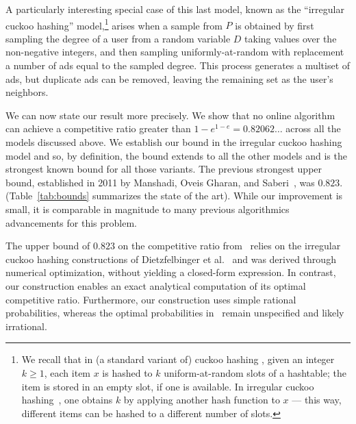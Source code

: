 \documentclass[11pt]{article}
\begin{document}
A particularly interesting special case of this last model, known  as the ``irregular cuckoo hashing'' model,\footnote{We recall that in (a standard variant of) cuckoo hashing \cite{pf04,dw07}, given an integer $k \ge 1$, each item $x$ is hashed to $k$ uniform-at-random slots of a hashtable; the item is stored in an empty slot, if one is available. In irregular cuckoo hashing~\cite{dgmmpr10}, one obtains $k$ by applying another hash function to $x$  --- this way, different items can be hashed to a different number of slots.} arises when a sample from \( P \) is obtained by first sampling the degree of a user from a random variable $D$ taking values over the non-negative integers, and then sampling uniformly-at-random with replacement a number of ads  equal to the sampled degree. This process generates a multiset of ads, but duplicate ads can be removed, leaving the remaining set as the user's neighbors. 

\smallskip

We can now state our result more precisely. We show that no online algorithm can achieve a competitive ratio greater than $1 - e^{1-e} = 0.82062\ldots$ across all the models discussed above.  We establish our bound in the irregular cuckoo hashing model and so, by definition, the bound extends to all the other models and is the strongest known bound for all those variants. The previous strongest upper bound, established in 2011 by Manshadi, Oveis Gharan, and Saberi~\cite{mos11}, was $0.823$. (Table~\ref{tab:bounds} summarizes the state of the art). While our improvement is small, it is comparable in magnitude to many previous algorithmics advancements for this problem. 

The upper bound of $0.823$ on the competitive ratio from~\cite{mos11} relies on the irregular cuckoo hashing constructions of Dietzfelbinger et al.~\cite{dgmmpr10} and was derived through numerical optimization, without yielding a closed-form expression.  
In contrast, our construction enables an exact analytical computation of its optimal competitive ratio. Furthermore, our construction uses simple rational probabilities, whereas the optimal probabilities in~\cite{mos11} remain unspecified and likely irrational. 
\end{document}
